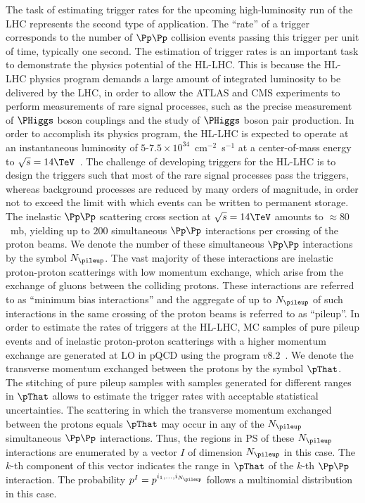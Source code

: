 The task of estimating trigger rates for the upcoming high-luminosity run of the LHC represents the second type of application.
The ``rate'' of a trigger corresponds to the number of $\Pp\Pp$ collision events passing this trigger per unit of time, typically one second.
The estimation of trigger rates is an important task to demonstrate the physics potential of the HL-LHC.
This is because the HL-LHC physics program demands a large amount of integrated luminosity to be delivered by the LHC,
in order to allow the ATLAS and CMS experiments to perform measurements of rare signal processes,
such as the precise measurement of $\PHiggs$ boson couplings and the study of $\PHiggs$ boson pair production.
In order to accomplish its physics program, the HL-LHC is expected to operate at an instantaneous luminosity of $5$-$7.5 \times 10^{34}$~cm$^{-2}$~s$^{-1}$
at a center-of-mass energy to $\sqrt{s} = 14\TeV$~\cite{TDR_Phase2_lhc}.
The challenge of developing triggers for the HL-LHC is to design the triggers such that most of the rare signal processes pass the triggers,
whereas background processes are reduced by many orders of magnitude, in order not to exceed the limit with which events can be written to permanent storage.
The inelastic $\Pp\Pp$ scattering cross section at $\sqrt{s} = 14\TeV$ amounts to $\approx 80$~mb,
yielding up to $200$ simultaneous $\Pp\Pp$ interactions per crossing of the proton beams. 
We denote the number of these simultaneous $\Pp\Pp$ interactions by the symbol $N_{\pileup}$.
The vast majority of these interactions are inelastic proton-proton scatterings with low momentum exchange,
which arise from the exchange of gluons between the colliding protons.
These interactions are referred to as ``minimum bias interactions'' and the aggregate of up to $N_{\pileup}$ of such interactions in the same crossing of the proton beams is referred to as ``pileup''.
In order to estimate the rates of triggers at the HL-LHC,
MC samples of pure pileup events and of inelastic proton-proton scatterings with a higher momentum exchange are generated at LO in pQCD
using the program \PYTHIA $v8.2$~\cite{Sjostrand:2014zea}.
We denote the transverse momentum exchanged between the protons by the symbol $\pThat$.
The stitching of pure pileup samples with samples generated for different ranges in $\pThat$ allows to estimate the trigger rates with acceptable statistical uncertainties.
The scattering in which the transverse momentum exchanged between the protons equals $\pThat$ may occur in any of the $N_{\pileup}$ simultaneous $\Pp\Pp$ interactions.
Thus, the regions in PS of these $N_{\pileup}$ interactions are enumerated by a vector $I$ of dimension $N_{\pileup}$ in this case.
The $k$-th component of this vector indicates the range in $\pThat$ of the $k$-th $\Pp\Pp$ interaction.
The probability $p^{I} = p^{i_{1},\dots,i_{N_{\pileup}}}$ follows a multinomial distribution in this case.





